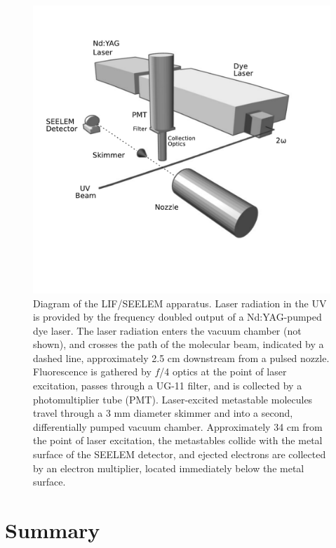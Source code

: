 \begin{figure}
  \caption{Diagram of the LIF/SEELEM apparatus.  Laser radiation in
    the UV is provided by the frequency doubled output of a
    Nd:YAG-pumped dye laser.  The laser radiation enters the vacuum
    chamber (not shown), and crosses the path of the molecular beam,
    indicated by a dashed line, approximately 2.5 cm downstream from a
    pulsed nozzle.  Fluorescence is gathered by $f$/4 optics at the
    point of laser excitation, passes through a UG-11 filter, and is
    collected by a photomultiplier tube (PMT).  Laser-excited
    metastable molecules travel through a 3 mm diameter skimmer and
    into a second, differentially pumped vacuum chamber.
    Approximately 34 cm from the point of laser excitation, the
    metastables collide with the metal surface of the SEELEM detector,
    and ejected electrons are collected by an electron multiplier,
    located immediately below the metal surface.}
  \label{fig:apparatus}
  \centering
  \includegraphics[width=7in,trim=1cm 0 0 0]{apparatus-bw}
\end{figure}




\section{Summary}

